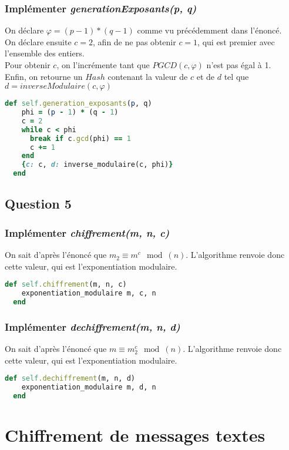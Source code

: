 \documentclass[a4paper,10pt]{article}
\begin{document}
\subsubsection{Implémenter \textit{generationExposants(p, q)}}
On déclare $\varphi = (p-1)*(q-1)$ comme vu précédemment dans l'énoncé.\\
On déclare ensuite $c = 2$, afin de ne pas obtenir $c=1$, qui est premier avec l'ensemble des entiers.\\
Pour obtenir $c$, on l'incrémente tant que $PGCD(c, \varphi)$ n'est pas égal à 1.\\
Enfin, on retourne un $Hash$ contenant la valeur de $c$ et de $d$ tel que $d = inverseModulaire(c, \varphi)$
\begin{lstlisting}[language=Ruby]
  def self.generation_exposants(p, q)
    phi = (p - 1) * (q - 1)
    c = 2
    while c < phi
      break if c.gcd(phi) == 1
      c += 1
    end
    {c: c, d: inverse_modulaire(c, phi)}
  end
\end{lstlisting}

\clearpage
\subsection{Question 5}
\subsubsection{Implémenter \textit{chiffrement(m, n, c)}}
On sait d'après l'énoncé que $m_2 \equiv m^c \mod(n)$. L'algorithme renvoie donc cette valeur, qui est l'exponentiation modulaire.\\
\begin{lstlisting}[language=Ruby]
  def self.chiffrement(m, n, c)
    exponentiation_modulaire m, c, n
  end
\end{lstlisting}

\subsubsection{Implémenter \textit{dechiffrement(m, n, d)}}
On sait d'après l'énoncé que $m \equiv m_2^c \mod(n)$. L'algorithme renvoie donc cette valeur, qui est l'exponentiation modulaire.\\
\begin{lstlisting}[language=Ruby]
  def self.dechiffrement(m, n, d)
    exponentiation_modulaire m, d, n
  end
\end{lstlisting}

\clearpage
\section{Chiffrement de messages textes}
\end{document}
